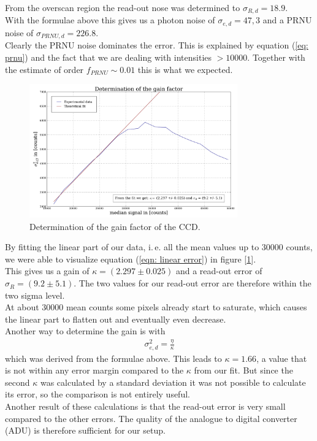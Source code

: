 From the overscan region the read-out nose was determined to $\sigma_{R, d} = 18.9$. \\

With the formulae above this gives us a photon noise of $\sigma_{e, d} = 47, 3$ and a PRNU noise of $\sigma_{PRNU, d} = 226.8$. \\

Clearly the PRNU noise dominates the error. This is explained by equation (\ref{eq: prnu}) and the fact that we are dealing with
intensities $> 10000$. Together with the estimate of order $f_{PRNU} \sim 0.01$ this is what we expected.

\begin{figure}[H]
	\centering
	\includegraphics[width=0.8\textwidth]{figures/Plots/gain}	
	\caption{Determination of the gain factor of the CCD.}
	\label{fig: gain factor}
\end{figure}

By fitting the linear part of our data, i.\,e. all the mean values up to 30000 counts, we were able to visualize equation (\ref{eqn: linear error}) in figure [\ref{fig: gain factor}]. \\

This gives us a gain of $\kappa = (2.297 \pm 0.025)$ and a read-out error of 
$\sigma_R = (9.2 \pm 5.1)$. The two values for our read-out error are therefore within the two sigma level. \\
At about 30000 mean counts some pixels already start to saturate, which causes the linear part to flatten out and eventually even decrease. \\

Another way to determine the gain is with 
\begin{align}
\sigma_{e, d}^2 = \frac{\eta}{\kappa} \label{eqn: kappa}
\end{align}
which was derived from the formulae above. This leads to $\kappa = 1.66$, a value that is not within any error margin
compared to the $\kappa$ from our fit. But since the second $\kappa$ was calculated by a standard deviation it was not possible to 
calculate its error, so the comparison is not entirely useful.\\

Another result of these calculations is that the read-out error is very small compared to the other errors. The quality of 
the analogue to digital converter (ADU) is therefore sufficient for our setup.
